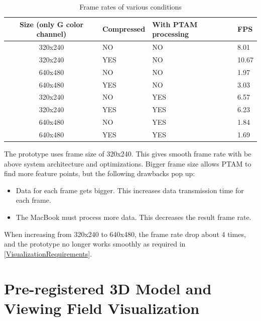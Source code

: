 \begin{table}[tb]
	\begin{center}
		\begin{tabular}{|c|l|l|l|}
			\hline
			Size (only G color channel) & Compressed & With PTAM processing & FPS   \\
			\hline
			320x240 & NO         & NO                   &  8.01 \\
			320x240 & YES        & NO                   & 10.67 \\
			640x480 & NO         & NO                   &  1.97 \\
			640x480 & YES        & NO                   &  3.03 \\
			320x240 & NO         & YES                  &  6.57 \\
			320x240 & YES        & YES                  &  6.23 \\
			640x480 & NO         & YES                  &  1.84 \\
			640x480 & YES        & YES                  &  1.69 \\
			\hline
		\end{tabular}
		\caption{Frame rates of various conditions}
	\end{center}
\end{table}

The prototype uses frame size of 320x240. This gives smooth frame rate with be above system architecture and optimizations. Bigger frame size allows PTAM to find more feature points, but the following drawbacks pop up:

\begin{itemize}
	\item Data for each frame gets bigger. This increases data transmission time for each frame.
	\item The MacBook must process more data. This decreases the result frame rate.
\end{itemize}

When increasing from 320x240 to 640x480, the frame rate drop about 4 times, and the prototype no longer works smoothly as required in \ref{VisualizationRequirements}.


\section{Pre-registered 3D Model and Viewing Field Visualization}
\label{3DModel}

